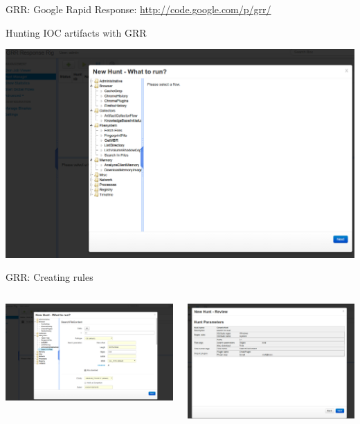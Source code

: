 \documentclass[presentation,smaller]{beamer}
\begin{document}
\begin{frame}[label=sec-7-9]{GRR: Google Rapid Response:}
\url{http://code.google.com/p/grr/}

Hunting IOC artifacts with GRR

\includegraphics[width=.9\linewidth]{images/grr.png}
\end{frame}
\begin{frame}[label=sec-7-10]{GRR: Creating rules}
\begin{columns}
\begin{column}{0.5\textwidth}
\includegraphics[width=.9\linewidth]{images/grr03.png}
\end{column}

\begin{column}{0.5\textwidth}
\includegraphics[width=.9\linewidth]{images/grr04.png}
\end{column}
\end{columns}
\end{frame}
\end{document}
